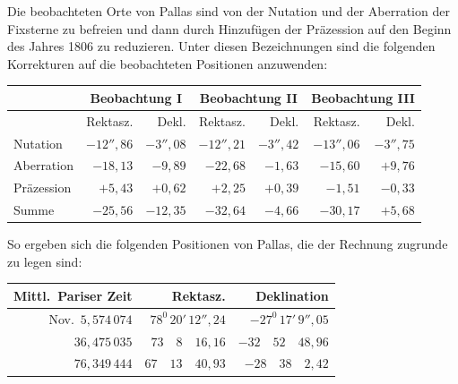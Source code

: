 Die beobachteten Orte von Pallas sind von der Nutation und der Aberration der Fixsterne zu befreien und dann durch Hinzufügen der Präzession auf den Beginn des Jahres 1806 zu reduzieren. Unter diesen Bezeichnungen sind die folgenden Korrekturen auf die beobachteten Positionen anzuwenden:
\begin{center}
\begingroup\footnotesize\setlength{\tabcolsep}{4pt}\renewcommand{\arraystretch}{1.2}
\begin{tabular}{|l|r|r||r|r||r|r|}\hline
& \multicolumn{2}{c||}{Beobachtung I} & \multicolumn{2}{c||}{Beobachtung II} & \multicolumn{2}{c|}{Beobachtung III}\\\hline
& Rektasz. & Dekl. & Rektasz. & Dekl. & Rektasz. & Dekl.\\\hline
Nutation & $-12''{,}86$ & $-3''{,}08$ & $-12''{,}21$ & $-3''{,}42$ & $-13''{,}06$ & $-3''{,}75$\\
Aberration & $-18{,}13$ & $-9{,}89$ & $-22{,}68$ & $-1{,}63$ & $-15{,}60$ & $+9{,}76$\\
Präzession & $+5{,}43$ & $+0{,}62$ & $+2{,}25$ & $+0{,}39$ & $-1{,}51$ & $-0{,}33$\\\hline
Summe & $-25{,}56$ & $-12{,}35$ & $-32{,}64$ & $-4{,}66$ & $-30{,}17$ & $+5{,}68$\\\hline
\end{tabular}\endgroup
\end{center}

So ergeben sich die folgenden Positionen von Pallas, die der Rechnung zugrunde zu legen sind:
\begin{center}
\begingroup\small\setlength{\tabcolsep}{6pt}\renewcommand{\arraystretch}{1.2}
\begin{tabular}{|r|r|r|}\hline
Mittl.\ Pariser Zeit & Rektasz. & Deklination\\\hline
Nov.\ $5{,}574\,074$ & $78^{0}\,20'\,12''{,}24$ & $-27^{0}\,17'\,9''{,}05$\\
$36{,}475\,035$ & $73\quad8\quad16{,}16$ & $-32\quad52\quad48{,}96$\\
$76{,}349\,444$ & $67\quad13\quad40{,}93$ & $-28\quad38\quad2{,}42$\\\hline
\end{tabular}\endgroup
\end{center}
